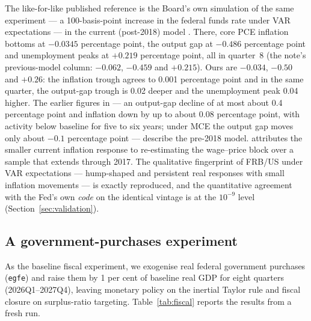 The like-for-like published reference is the Board's own simulation of the same experiment --- a 100-basis-point increase in the federal funds rate under VAR expectations --- in the current (post-2018) model \citep[Fig.~2]{laforte2018changes}. There, core PCE inflation bottoms at $-0.0345$ percentage point, the output gap at $-0.486$ percentage point and unemployment peaks at $+0.219$ percentage point, all in quarter~8 (the note's previous-model column: $-0.062$, $-0.459$ and $+0.215$). Ours are $-0.034$, $-0.50$ and $+0.26$: the inflation trough agrees to 0.001 percentage point and in the same quarter, the output-gap trough is 0.02 deeper and the unemployment peak 0.04 higher. The earlier figures in \citet{brayton2014note} --- an output-gap decline of at most about 0.4 percentage point and inflation down by up to about 0.08 percentage point, with activity below baseline for five to six years; under MCE the output gap moves only about $-0.1$ percentage point --- describe the pre-2018 model. \citet{laforte2018changes} attributes the smaller current inflation response to re-estimating the wage--price block over a sample that extends through 2017. The qualitative fingerprint of FRB/US under VAR expectations --- hump-shaped and persistent real responses with small inflation movements --- is exactly reproduced, and the quantitative agreement with the Fed's own \emph{code} on the identical vintage is at the $10^{-9}$ level (Section~\ref{sec:validation}).

\subsection{A government-purchases experiment}
\label{sec:fiscal}

As the baseline fiscal experiment, we exogenise real federal government purchases (\texttt{egfe}) and raise them by 1 per cent of baseline real GDP for eight quarters (2026Q1--2027Q4), leaving monetary policy on the inertial Taylor rule and fiscal closure on surplus-ratio targeting. Table~\ref{tab:fiscal} reports the results from a fresh run.

